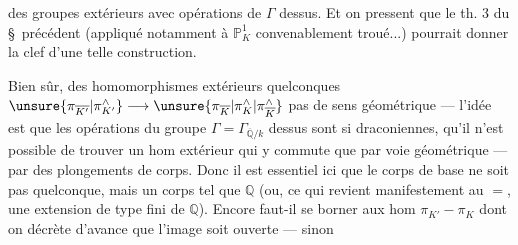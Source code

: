 des groupes  extérieurs avec opérations de $\Gamma$ dessus. Et on pressent que le th. 3 du \S\ précédent (appliqué notamment à $\mathbb P_K^1$ convenablement troué...) pourrait donner la clef d'une telle construction.

Bien  sûr, des homomorphismes extérieurs quelconques $\unsure{\pi_{\overline{K'}}|\pi^{\wedge}_{K'}}\longrightarrow\unsure{\pi_{\overline K}|\pi^{\wedge}_K|\pi^{\wedge}_{\overline K}}$  pas de sens géométrique --- l'idée est que les opérations du groupe $\Gamma=\Gamma_{\overline{\mathbb Q}/k}$ dessus sont si draconiennes, qu'il n'est possible de trouver un hom extérieur qui y commute que par voie géométrique --- par des plongements de corps. Donc il est essentiel ici que le corps de base ne soit pas quelconque, mais un corps tel que $\mathbb Q$ (ou, ce qui revient manifestement au $=$, une extension de type fini de $\mathbb Q$). Encore faut-il se borner aux hom $\pi_{K'}-\pi_K$ dont on décrète d'avance que l'image soit ouverte --- sinon
